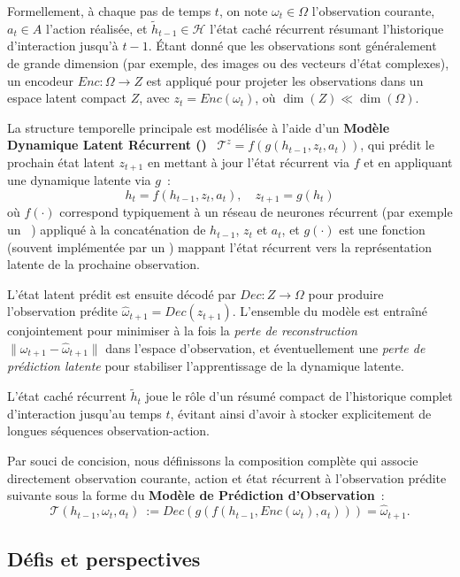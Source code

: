 Formellement, à chaque pas de temps $t$, on note $\omega_t \in \Omega$ l'observation courante, $a_t \in A$ l'action réalisée, et $\tilde{h}_{t-1} \in \mathcal{H}$ l'état caché récurrent résumant l'historique d'interaction jusqu'à $t-1$. Étant donné que les observations sont généralement de grande dimension (par exemple, des images ou des vecteurs d'état complexes), un encodeur $Enc: \Omega \rightarrow Z$ est appliqué pour projeter les observations dans un espace latent compact $Z$, avec $z_t = Enc(\omega_t)$, où $\dim(Z) \ll \dim(\Omega)$.

La structure temporelle principale est modélisée à l'aide d'un \textbf{Modèle Dynamique Latent Récurrent ()}~\cite{hafner2020dream} $\mathcal{T}^{z} = f(g(h_{t-1}, z_t, a_t))$, qui prédit le prochain état latent $z_{t+1}$ en mettant à jour l'état récurrent via $f$ et en appliquant une dynamique latente via $g$~:
\[
  h_t = f(h_{t-1}, z_t, a_t), \quad z_{t+1} = g(h_t)
\]
où $f(\cdot)$ correspond typiquement à un réseau de neurones récurrent (par exemple un ~\cite{hochreiter1997long}) appliqué à la concaténation de $h_{t-1}$, $z_t$ et $a_t$, et $g(\cdot)$ est une fonction (souvent implémentée par un ) mappant l'état récurrent vers la représentation latente de la prochaine observation.

L'état latent prédit est ensuite décodé par $Dec: Z \rightarrow \Omega$ pour produire l'observation prédite $\hat{\omega}_{t+1} = Dec(z_{t+1})$. L'ensemble du modèle est entraîné conjointement pour minimiser à la fois la \emph{perte de reconstruction} $\|\omega_{t+1} - \hat{\omega}_{t+1}\|$ dans l'espace d'observation, et éventuellement une \emph{perte de prédiction latente} pour stabiliser l'apprentissage de la dynamique latente.

L'état caché récurrent $\tilde{h}_t$ joue le rôle d'un résumé compact de l'historique complet d'interaction jusqu'au temps $t$, évitant ainsi d'avoir à stocker explicitement de longues séquences observation-action.

Par souci de concision, nous définissons la composition complète qui associe directement observation courante, action et état récurrent à l'observation prédite suivante sous la forme du \textbf{Modèle de Prédiction d'Observation}~:
\[
  \mathcal{T}(h_{t-1}, \omega_t, a_t)~:= Dec(g(f(h_{t-1}, Enc(\omega_t), a_t))) = \hat{\omega}_{t+1}.
\]

\subsection{Défis et perspectives}

